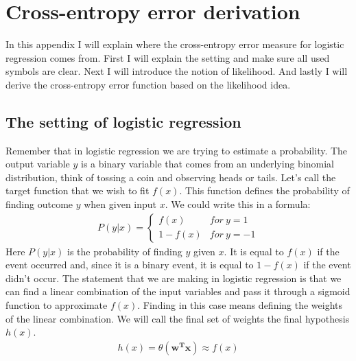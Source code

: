 \chapter{Cross-entropy error derivation}
\label{app:cross-entropy}
In this appendix I will explain where the cross-entropy error measure for logistic regression comes from. First I will explain the setting and make sure all used symbols are clear. Next I will introduce the notion of likelihood. And lastly I will derive the cross-entropy error function based on the likelihood idea.

\section{The setting of logistic regression}
Remember that in logistic regression we are trying to estimate a probability. The output variable $y$ is a binary variable that comes from an underlying binomial distribution, think of tossing a coin and observing heads or tails. Let's call the target function that we wish to fit $f(x)$. This function defines the probability of finding outcome $y$ when given input $x$. We could write this in a formula:
\begin{equation}
\begin{split}
P(y | x) =
\begin{cases} 
f(x) & for\ y=1 \\
1-f(x) & for\ y=-1 
\end{cases}
\end{split}
\end{equation}
Here $P(y | x)$ is the probability of finding $y$ given $x$. It is equal to $f(x)$ if the event occurred and, since it is a binary event, it is equal to $1-f(x)$ if the event didn't occur. The statement that we are making in logistic regression is that we can find a linear combination of the input variables and pass it through a sigmoid function to approximate $f(x)$. Finding in this case means defining the weights of the linear combination. We will call the final set of weights the final hypothesis $h(x)$.
\begin{equation}
\begin{split}
h(x) = \theta(\bm{w^{T}x}) \approx f(x)
\end{split}
\end{equation}
